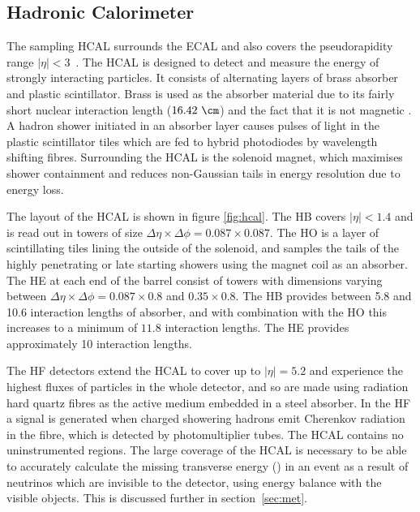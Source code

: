 \subsection{Hadronic Calorimeter}
\label{sec:hcal}

The sampling \ac{HCAL} surrounds the \ac{ECAL} and also
covers the pseudorapidity range $|\eta|<3$~\cite{Chatrchyan:2008aa}. The
\ac{HCAL} is designed to detect and measure the energy of strongly interacting
particles. It consists of alternating layers of brass absorber and plastic
scintillator. Brass is used as the absorber material due to its fairly short
nuclear interaction length ($16.42~\cm$) and the fact that it is not magnetic
\cite{PDG}. A hadron shower initiated in an absorber layer causes pulses of 
light in the plastic scintillator tiles which are fed to hybrid photodiodes 
by wavelength shifting fibres. Surrounding the \ac{HCAL} is the solenoid magnet,
which maximises shower containment and reduces non-Gaussian tails in energy
resolution due to energy loss. 

The layout of the \ac{HCAL} is shown in figure \ref{fig:hcal}. The \ac{HB}
covers $|\eta|<1.4$ and is read out in towers of size
$\Delta\eta \times \Delta\phi = 0.087\times0.087$. The \ac{HO}
is a layer of scintillating tiles lining the outside of the solenoid, and
samples the tails of the highly penetrating or late starting showers using the magnet coil as an
absorber. The \ac{HE} at each end of the barrel
consist of towers with dimensions varying between $\Delta\eta \times \Delta\phi
= 0.087\times0.8$ and $0.35\times0.8$. The \ac{HB} provides between 5.8 and 10.6
interaction lengths of absorber, and with combination with the \ac{HO} this increases
to a minimum of $11.8$ interaction lengths. The \ac{HE} provides approximately
10 interaction lengths. 

The \ac{HF} detectors extend the \ac{HCAL} to cover up
to $|\eta|=5.2$ and experience the highest fluxes of particles in the whole
detector, and so are made using radiation hard quartz fibres as the active medium
embedded in a steel absorber. In the \ac{HF} a signal is generated when charged
showering hadrons emit Cherenkov radiation in the fibre, which is detected by
photomultiplier tubes. The \ac{HCAL} contains no
uninstrumented regions. The large coverage of the
\ac{HCAL} is necessary to be able to accurately calculate the missing transverse energy
(\MET) in an event as a result of neutrinos which are invisible to the detector,
using energy balance with the visible objects. This is discussed further in
section~\ref{sec:met}.


